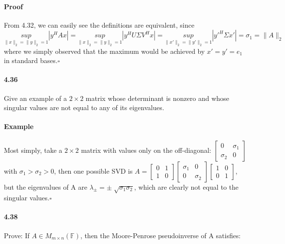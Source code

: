 \documentclass[letterpaper,12pt]{article}
\theoremstyle{definition}
\begin{document}
\paragraph{Proof} From 4.32, we can easily see the definitions are equivalent, since $\underset{\|x\|_2 = \|y\|_2 = 1}{sup}|y^HAx|
= \underset{\|x\|_2 = \|y\|_2 = 1}{sup}|y^HU \Sigma V^H x|
= \underset{\|x'\|_2 = \|y'\|_2 = 1}{sup}|y'^H \Sigma x'|
= \sigma_1 = \|A\|_2$
where we simply observed that the maximum would be achieved by $x' = y' = e_1$ in standard bases.$\square$

\paragraph{4.36} Give an example of a $2 \times 2$ matrix whose determinant is nonzero and whose singular values are not equal to any of its eigenvalues.

\paragraph{Example} Most simply, take a $2 \times 2$ matrix with values only on the off-diagonal:
$\begin{bmatrix}
0 & \sigma_1 \\
\sigma_2 & 0
\end{bmatrix}$ with $\sigma_1 > \sigma_2 > 0$,
then one possible SVD is 
$ A = 
\begin{bmatrix}
0 & 1 \\
1 & 0
\end{bmatrix}
\begin{bmatrix}
\sigma_1 & 0\\
0 & \sigma_2 
\end{bmatrix}
\begin{bmatrix}
1 & 0\\
0 & 1
\end{bmatrix}$, but the  eigenvalues of A are $\lambda_\pm = \pm \sqrt[]{\sigma_1\sigma_2}$, which are clearly not equal to the singular values.$\square$
   
\paragraph{4.38} Prove:
If $A \in M_{m \times n}(\mathbb{F})$, then the Moore-Penrose pseudoinverse of A satisfies:
\end{document}

